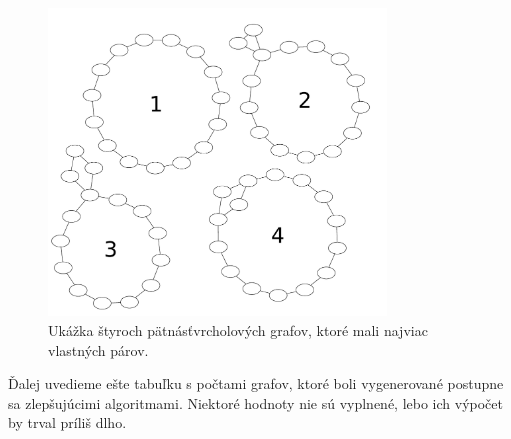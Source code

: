 \begin{figure}
\centerline{\includegraphics[width=0.8\textwidth]{images/best_ec2.pdf}}

\caption[$2$-hranovo súvislé grafy s najviac vlastnými pármi]{Ukážka štyroch pätnásťvrcholových
grafov, ktoré mali najviac vlastných párov.}

\label{graf:bestec2}
\end{figure}

Ďalej uvedieme ešte tabuľku s počtami grafov, ktoré boli vygenerované postupne sa zlepšujúcimi
algoritmami. Niektoré hodnoty nie sú vyplnené, lebo ich výpočet by trval príliš dlho.

